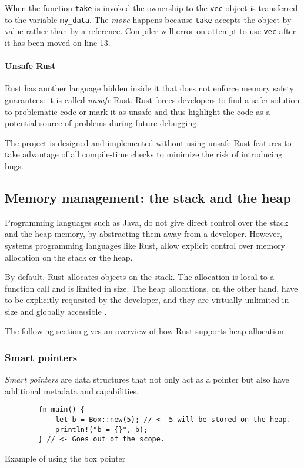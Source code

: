 When the function \texttt{take} is invoked the ownership to the \texttt{vec} object is transferred to the variable \texttt{my_data}. The \emph{move} happens because \texttt{take} accepts the object by value rather than by a reference. Compiler will error on attempt to use \texttt{vec} after it has been moved on line 13.

\paragraph{Unsafe Rust}
Rust has another language hidden inside it that does not enforce memory safety guarantees: it is called \emph{unsafe} Rust. Rust forces developers to find a safer solution to problematic code or mark it as unsafe and thus highlight the code as a potential source of problems during future debugging.

The \pvecrs{} project is designed and implemented without using unsafe Rust features to take advantage of all compile-time checks to minimize the risk of introducing bugs.

\subsection{Memory management: the stack and the heap}
\label{sec:memory-management-in-rust}

Programming languages such as Java, do not give direct control over the stack and the heap memory, by abstracting them away from a developer. However, systems programming languages like Rust, allow explicit control over memory allocation on the stack or the heap.

By default, Rust allocates objects on the stack. The allocation is local to a function call and is limited in size. The heap allocations, on the other hand, have to be explicitly requested by the developer, and they are virtually unlimited in size and globally accessible \cite{rust-book-2e}.

The following section gives an overview of how Rust supports heap allocation.

\subsubsection*{Smart pointers}
\emph{Smart pointers} are data structures that not only act as a pointer but also have additional metadata and capabilities.

\begin{listing}[!ht]

    \centering
    \begin{verbatim}
        fn main() {
            let b = Box::new(5); // <- 5 will be stored on the heap.
            println!("b = {}", b);
        } // <- Goes out of the scope.
    \end{verbatim}

    \caption{Example of using the box pointer}
    \label{lst:box}
\end{listing}

